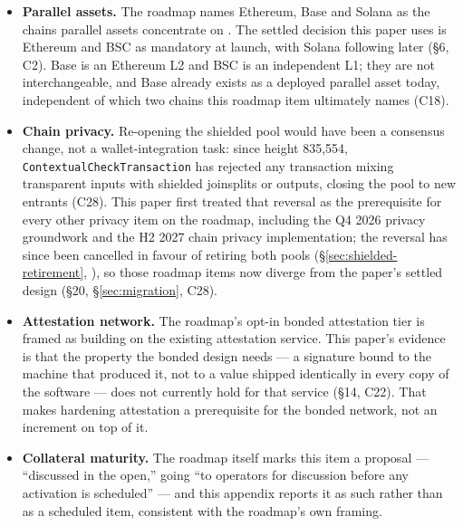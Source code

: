 \begin{itemize}
burn term (\S7, C1). These differ in who is paid, where the payment goes, and what deters
self-dealing, and the paper follows its own formalized design while stating the roadmap's
language plainly rather than reconciling the two. A related, narrower divergence: this paper's
design activates PNR simultaneously with the parallel-asset mining-reward cut, while the roadmap
places that retirement strictly after PNR is demonstrably paying operators (C1a).
\item \textbf{Parallel assets.} The roadmap names Ethereum, Base and Solana as the chains
parallel assets concentrate on . The
settled decision this paper uses is Ethereum and BSC as mandatory at launch, with Solana
following later (\S6, C2). Base is an Ethereum L2 and BSC is an independent L1; they are not
interchangeable, and Base already exists as a deployed parallel asset today, independent of
which two chains this roadmap item ultimately names (C18).
\item \textbf{Chain privacy.} Re-opening the shielded pool would have been a consensus change, not a
wallet-integration task: since height 835{,}554, \texttt{Contextual\allowbreak{}Check\allowbreak{}Transaction} has
rejected any transaction mixing transparent inputs with shielded joinsplits or outputs, closing
the pool to new entrants (C28). This paper first treated that reversal as the prerequisite for every
other privacy item on the roadmap, including the Q4 2026 privacy groundwork and the H2 2027 chain
privacy implementation; the reversal has since been cancelled in favour of retiring both pools
(\S\ref{sec:shielded-retirement}, ), so those roadmap
items now diverge from the paper's settled design (\S20, \S\ref{sec:migration}, C28).
\item \textbf{Attestation network.} The roadmap's opt-in bonded attestation tier is framed as
building on the existing attestation service. This paper's evidence is that the property the
bonded design needs — a signature bound to the machine that produced it, not to a value shipped
identically in every copy of the software — does not currently hold for that service (\S14, C22).
That makes hardening attestation a prerequisite for the bonded network, not an increment on top
of it.
\item \textbf{Collateral maturity.} The roadmap itself marks this item a proposal — ``discussed
in the open,'' going ``to operators for discussion before any activation is scheduled''
 — and this appendix reports it as
such rather than as a scheduled item, consistent with the roadmap's own framing.
\end{itemize}

